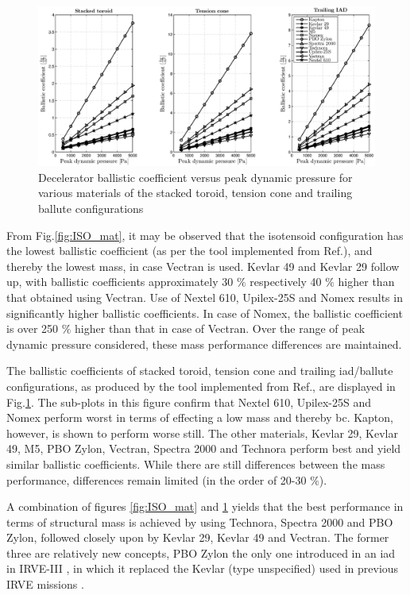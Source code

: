 \begin{figure}[H]
\hspace{-35mm}
\includegraphics[width = 1.35\textwidth]{Figure/all_mat.eps}
\caption{Decelerator ballistic coefficient versus peak dynamic pressure for various materials of the stacked toroid, tension cone and trailing ballute configurations}
\label{fig:all_mat}
\end{figure}

From Fig.\ref{fig:ISO_mat}, it may be observed that the isotensoid configuration has the lowest ballistic coefficient (as per the tool implemented from Ref.\cite{Anderson1969}), and thereby the lowest mass, in case Vectran is used. Kevlar 49 and Kevlar 29 follow up, with ballistic coefficients approximately 30 $\%$ respectively 40 $\%$ higher than that obtained using Vectran. Use of Nextel 610, Upilex-25S and Nomex results in significantly higher ballistic coefficients. In case of Nomex, the ballistic coefficient is over 250 $\%$ higher than that in case of Vectran. Over the range of peak dynamic pressure considered, these mass performance differences are maintained. 

The ballistic coefficients of stacked toroid, tension cone and trailing \gls{iad}/ballute configurations, as produced by the tool implemented from Ref.\cite{Samareh2011}, are displayed in Fig.\ref{fig:all_mat}. The sub-plots in this figure confirm that Nextel 610, Upilex-25S and Nomex perform worst in terms of effecting a low mass and thereby \gls{bc}. Kapton, however, is shown to perform worse still. The other materials, Kevlar 29, Kevlar 49, M5, PBO Zylon, Vectran, Spectra 2000 and Technora perform best and yield similar ballistic coefficients. While there are still differences between the mass performance, differences remain limited (in the order of 20-30 $\%$). 

A combination of figures \ref{fig:ISO_mat} and \ref{fig:all_mat} yields that the best performance in terms of structural mass is achieved by using Technora, Spectra 2000 and PBO Zylon, followed closely upon by Kevlar 29, Kevlar 49 and Vectran. The former three are relatively new concepts, PBO Zylon the only one introduced in an \gls{iad} in IRVE-III \cite{Dillman2012}, in which it replaced the Kevlar (type unspecified) used in previous IRVE missions \cite{Lindell2006}.


